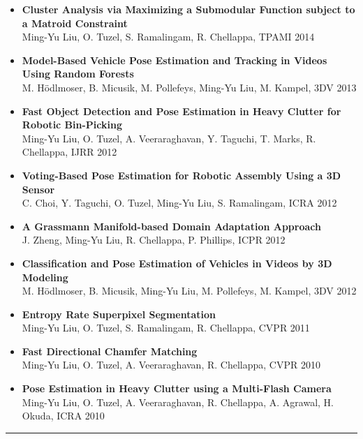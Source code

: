 \documentclass[10pt,letterpaper]{article}
\begin{document}
\begin{itemize}
\item {\bf Cluster Analysis via Maximizing a Submodular Function subject to a Matroid Constraint}\\
      {Ming-Yu Liu}, O. Tuzel, S. Ramalingam, R. Chellappa, {TPAMI} 2014\vspace{-2mm}
\item {\bf Model-Based Vehicle Pose Estimation and Tracking in Videos Using Random Forests}\\
      M. Hödlmoser, B. Micusik, M. Pollefeys, {Ming-Yu Liu}, M. Kampel, {3DV} 2013\vspace{-2mm}
\item {\bf Fast Object Detection and Pose Estimation in Heavy Clutter for Robotic Bin-Picking}\\      
			{Ming-Yu Liu}, O. Tuzel, A. Veeraraghavan, Y. Taguchi, T. Marks, R. Chellappa, {IJRR} 2012\vspace{-2mm}
\item {\bf Voting-Based Pose Estimation for Robotic Assembly Using a 3D Sensor}\\
      C. Choi, Y. Taguchi, O. Tuzel, {Ming-Yu Liu}, S. Ramalingam, {ICRA} 2012\vspace{-2mm}
\item {\bf A Grassmann Manifold-based Domain Adaptation Approach}\\
			J. Zheng, {Ming-Yu Liu}, R. Chellappa, P. Phillips, {ICPR} 2012\vspace{-2mm}
\item {\bf Classification and Pose Estimation of Vehicles in Videos by 3D Modeling}\\%
      M. Hödlmoser, B. Micusik, {Ming-Yu Liu}, M. Pollefeys, M. Kampel, {3DV} 2012\vspace{-2mm}
\item {\bf Entropy Rate Superpixel Segmentation}\\                
			{Ming-Yu Liu}, O. Tuzel, S. Ramalingam, R. Chellappa, CVPR 2011\vspace{-2mm}
\item {\bf Fast Directional Chamfer Matching}\\                
			{Ming-Yu Liu}, O. Tuzel, A. Veeraraghavan, R. Chellappa, CVPR 2010\vspace{-2mm}
\item {\bf Pose Estimation in Heavy Clutter using a Multi-Flash Camera}\\
      {Ming-Yu Liu}, O. Tuzel, A. Veeraraghavan, R. Chellappa, A. Agrawal, H. Okuda, ICRA 2010\vspace{-2mm}
\end{itemize}
\hrule
\vspace{-0.4em}
\end{document}
